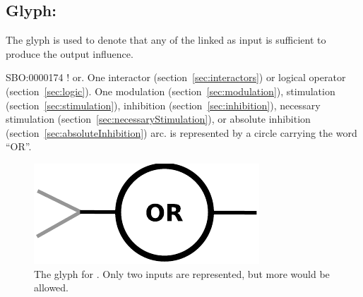 \color{blue}
\subsection{Glyph: }\label{sec:or}

The glyph  is used to denote that any of the  linked as input is sufficient to produce the output influence.

\begin{glyphDescription}
 \glyphSboTerm SBO:0000174 ! or.
 \glyphOrigin One interactor (section~\ref{sec:interactors}) or logical operator (section~\ref{sec:logic}).
 \glyphTarget  One modulation (section~\ref{sec:modulation}), stimulation (section~\ref{sec:stimulation}), inhibition (section~\ref{sec:inhibition}), necessary  stimulation (section~\ref{sec:necessaryStimulation}), or absolute inhibition (section~\ref{sec:absoluteInhibition}) arc.
 \glyphNode {} is represented by a circle carrying the word ``OR''.
 \end{glyphDescription}

\begin{figure}[H]
  \centering
  \includegraphics[scale = 0.5]{images/or}
  \caption{The \ER glyph for . Only two inputs are represented, but more would be allowed.}
  \label{fig:or}
\end{figure}



